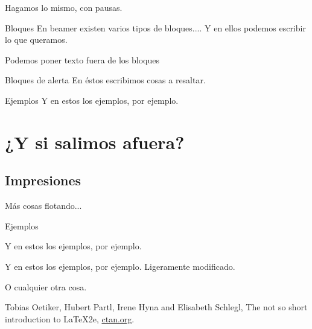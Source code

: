 \documentclass{beamer}
\begin{document}
\begin{frame}

Hagamos lo mismo, con pausas.

\begin{block}{Bloques}
En beamer existen varios tipos de bloques....
Y en ellos podemos escribir lo que queramos.
\end{block}

\pause 
Podemos poner texto fuera de los bloques

\pause
\begin{alertblock}{Bloques de alerta}
En éstos escribimos cosas a resaltar.
\end{alertblock}

\pause
\begin{exampleblock}{Ejemplos}
Y en estos los ejemplos, por ejemplo.
\end{exampleblock}

\end{frame}

\section{¿Y si salimos afuera?}

\subsection{Impresiones}

\begin{frame}

Más cosas flotando...

\begin{exampleblock}{Ejemplos}
\begin{overprint}


Y en estos los ejemplos, por ejemplo.


Y en estos los ejemplos, por ejemplo. Ligeramente modificado.


O cualquier otra cosa.

\end{overprint}
\end{exampleblock}

\end{frame}

\begin{thebibliography}{10}
 Tobias Oetiker, Hubert Partl, Irene Hyna and Elisabeth Schlegl, The not so short introduction to \LaTeX2e, \href{http://www.ctan.org/tex-archive/info/lshort/english/lshort.pdf}{ctan.org}.
\end{thebibliography}
\end{document}
